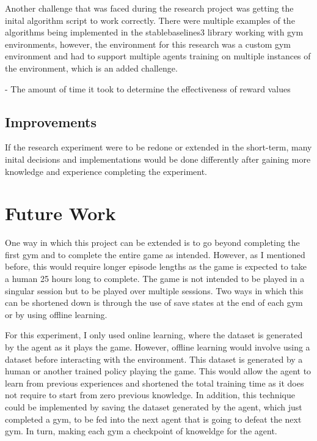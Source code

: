 Another challenge that was faced during the research project was getting the inital algorithm script to work correctly. There were multiple examples of the algorithms being implemented in the stablebaselines3 library working with gym environments, however, the environment for this research was a custom gym environment and had to support multiple agents training on multiple instances of the environment, which is an added challenge. 

- The amount of time it took to determine the effectiveness of reward values

\subsection{Improvements}

If the research experiment were to be redone or extended in the short-term, many inital decisions and implementations would be done differently after gaining more knowledge and experience completing the experiment. 

\section{Future Work}

One way in which this project can be extended is to go beyond completing the first gym and to complete the entire game as intended. However, as I mentioned before, this would require longer episode lengths as the game is expected to take a human 25 hours long to complete. The game is not intended to be played in a singular session but to be played over multiple sessions. Two ways in which this can be shortened down is through the use of save states at the end of each gym or by using offline learning. 

For this experiment, I only used online learning, where the dataset is generated by the agent as it plays the game. However, offline learning would involve using a dataset before interacting with the environment. This dataset is generated by a human or another trained policy playing the game. This would allow the agent to learn from previous experiences and shortened the total training time as it does not require to start from zero previous knowledge. In addition, this technique could be implemented by saving the dataset generated by the agent, which just completed a gym, to be fed into the next agent that is going to defeat the next gym. In turn, making each gym a checkpoint of knoweldge for the agent. 

